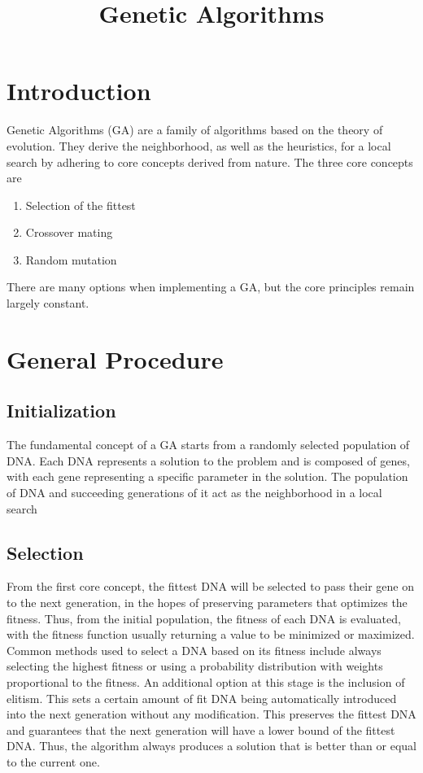 \documentclass[sigconf]{acmart}
\begin{document}
\title{Genetic Algorithms}
\maketitle
\section{Introduction}
Genetic Algorithms (GA) are a family of algorithms based on the theory of evolution. They derive the neighborhood, as well as the heuristics, for a local search by adhering to core concepts derived from nature. The three core concepts are
\begin{enumerate}
  \item Selection of the fittest 
  \item Crossover mating
  \item Random mutation
\end{enumerate}
There are many options when implementing a GA, but the core principles remain largely constant.

\section{General Procedure}
\subsection{Initialization}
The fundamental concept of a GA starts from a randomly selected population of DNA. Each DNA represents a solution to the problem and is composed of genes, with each gene representing a specific parameter in the solution. The population of DNA and succeeding generations of it act as the neighborhood in a local search

\subsection{Selection}
From the first core concept, the fittest DNA will be selected to pass their gene on to the next generation, in the hopes of preserving parameters that optimizes the fitness. Thus, from the initial population, the fitness of each DNA is evaluated, with the fitness function usually returning a value to be minimized or maximized. Common methods used to select a DNA based on its fitness include always selecting the highest fitness or using a probability distribution with weights proportional to the fitness.
An additional option at this stage is the inclusion of elitism. This sets a certain amount of fit DNA being automatically introduced into the next generation without any modification. This preserves the fittest DNA and guarantees that the next generation will have a lower bound of the fittest DNA. Thus, the algorithm always produces a solution that is better than or equal to the current one.
\end{document}
